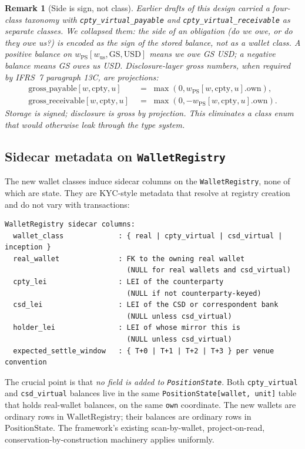 \documentclass[11pt,a4paper]{article}
\newtheorem{remark}[definition]{Remark}
\begin{document}
\begin{remark}[Side is sign, not class]
Earlier drafts of this design carried a four-class taxonomy with \texttt{cpty\_virtual\_payable} and \texttt{cpty\_virtual\_receivable} as separate classes. We collapsed them: the \emph{side} of an obligation (do we owe, or do they owe us?) is encoded as the sign of the stored balance, not as a wallet class. A positive balance on $w_{\mathrm{PS}}[w_{\mathrm{us}}, \mathrm{GS}, \mathrm{USD}]$ means we owe GS USD; a negative balance means GS owes us USD. Disclosure-layer gross numbers, when required by IFRS~7 paragraph 13C, are projections:
\begin{align*}
\mathrm{gross\_payable}[w, \mathrm{cpty}, u]   &\;=\; \max(0, w_{\mathrm{PS}}[w, \mathrm{cpty}, u].\mathrm{own}), \\
\mathrm{gross\_receivable}[w, \mathrm{cpty}, u] &\;=\; \max(0, -w_{\mathrm{PS}}[w, \mathrm{cpty}, u].\mathrm{own}).
\end{align*}
Storage is signed; disclosure is gross by projection. This eliminates a class enum that would otherwise leak through the type system.
\end{remark}

\subsection{Sidecar metadata on \texttt{WalletRegistry}}

The new wallet classes induce sidecar columns on the \texttt{WalletRegistry}, none of which are state. They are KYC-style metadata that resolve at registry creation and do not vary with transactions:

\begin{lstlisting}
WalletRegistry sidecar columns:
  wallet_class             : { real | cpty_virtual | csd_virtual | inception }
  real_wallet              : FK to the owning real wallet
                             (NULL for real wallets and csd_virtual)
  cpty_lei                 : LEI of the counterparty
                             (NULL if not counterparty-keyed)
  csd_lei                  : LEI of the CSD or correspondent bank
                             (NULL unless csd_virtual)
  holder_lei               : LEI of whose mirror this is
                             (NULL unless csd_virtual)
  expected_settle_window   : { T+0 | T+1 | T+2 | T+3 } per venue convention
\end{lstlisting}

The crucial point is that \emph{no field is added to \texttt{PositionState}}. Both \texttt{cpty\_virtual} and \texttt{csd\_virtual} balances live in the same \texttt{PositionState[wallet, unit]} table that holds real-wallet balances, on the same \texttt{own} coordinate. The new wallets are ordinary rows in $\mathrm{WalletRegistry}$; their balances are ordinary rows in $\mathrm{PositionState}$. The framework's existing scan-by-wallet, project-on-read, conservation-by-construction machinery applies uniformly.
\end{document}
